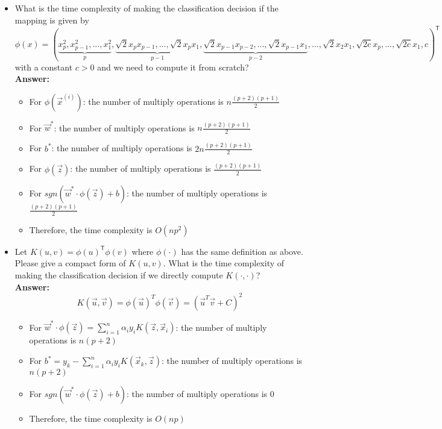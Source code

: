 \begin{enumerate}
\begin{itemize}
\item What is the time complexity of making the classification decision if the mapping is given by $$\phi(x) = (\underbrace{x_p^2, x_{p-1}^2, ..., x_1^2}_{p}, \underbrace{ \sqrt{2}x_{p}x_{p-1},..., \sqrt{2}x_{p}x_{1}}_{p-1}, \underbrace{\sqrt{2}x_{p-1}x_{p-2},...,\sqrt{2}x_{p-1}x_{1}}_{p-2},...,\sqrt{2}x_{2}x_{1}, \sqrt{2c}x_{p},...,\sqrt{2c}x_{1}, c)^\mathsf{T}$$
with a constant $c>0$ and we need to compute it from scratch?
\\\textbf{Answer:}\\
\begin{itemize}
	\item For $\phi(\vec{x}^{(i)})$: the number of multiply operations is $n\frac{(p+2)(p+1)}{2}$
	\item For $\vec{w}^*$: the number of multiply operations is $n\frac{(p+2)(p+1)}{2}$
	\item For $b^*$: the number of multiply operations is $2n\frac{(p+2)(p+1)}{2}$
	\item For $\phi(\vec{z})$: the number of multiply operations is $\frac{(p+2)(p+1)}{2}$
	\item For $sgn(\vec{w}^*\cdot\phi(\vec{z})+b)$:	the number of multiply operations is $\frac{(p+2)(p+1)}{2}$
	\item Therefore, the time complexity is $O(np^2)$
\end{itemize}

\item  Let $K(u,v) = \phi(u)^\mathsf{T}\phi(v)$ where $\phi(\cdot)$ has the same definition as above. Please give a compact form of $K(u,v)$. What is the time complexity of making the classification decision if we directly compute $K(\cdot, \cdot)$?
\\\textbf{Answer:}\\
$$K(\vec{u},\vec{v}) = \phi(\vec{u})^T\phi(\vec{v}) = (\vec{u}^T\vec{v}+C)^2$$
\begin{itemize}
	\item For $\vec{w}^*\cdot\phi(\vec{z})=\sum_{i=1}^{n}\alpha_iy_iK(\vec{z},\vec{x}_i)$: the number of multiply operations is $n(p+2)$
	\item For $b^*=y_k-\sum_{i=1}^{n}\alpha_iy_iK(\vec{x}_k,\vec{z})$: the number of multiply operations is $n(p+2)$
	\item For $sgn(\vec{w}^*\cdot\phi(\vec{z})+b)$:	the number of multiply operations is $0$
	\item Therefore, the time complexity is $O(np)$
\end{itemize}


\end{itemize}
\end{enumerate}
